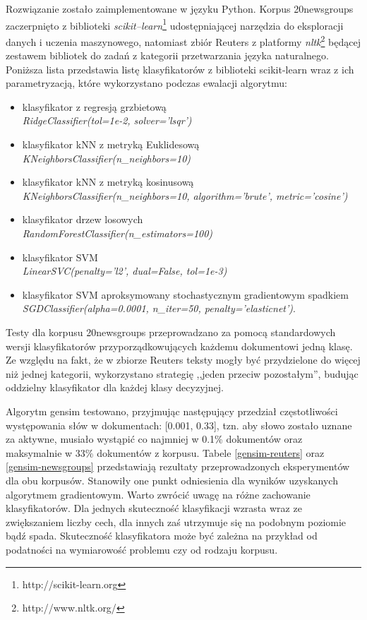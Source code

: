 \documentclass{pracamgr}
\begin{document}
Rozwiązanie zostało zaimplementowane w języku Python. Korpus 20newsgroups zaczerpnięto z biblioteki \textit{scikit--learn}\footnote{http://scikit-learn.org} udostępniającej narzędzia do eksploracji danych i uczenia maszynowego, natomiast zbiór Reuters z platformy \textit{nltk}\footnote{http://www.nltk.org/} będącej zestawem bibliotek do zadań z kategorii przetwarzania języka naturalnego. Poniższa lista przedstawia listę klasyfikatorów z biblioteki scikit-learn wraz z ich parametryzacją, które wykorzystano podczas ewalacji algorytmu:

\begin{itemize}
    \item klasyfikator z regresją grzbietową\\ \textit{RidgeClassifier(tol=1e-2, solver='lsqr')}
    \item klasyfikator kNN z metryką Euklidesową\\ \textit{KNeighborsClassifier(n\_neighbors=10)}
    \item klasyfikator kNN z metryką kosinusową\\
    \textit{KNeighborsClassifier(n\_neighbors=10, algorithm='brute', metric='cosine')}
    \item klasyfikator drzew losowych\\ \textit{RandomForestClassifier(n\_estimators=100)}
    \item klasyfikator SVM\\ \textit{LinearSVC(penalty='l2', dual=False, tol=1e-3)}
    \item klasyfikator SVM aproksymowany stochastycznym gradientowym spadkiem\\ \textit{SGDClassifier(alpha=0.0001, n\_iter=50, penalty='elasticnet')}.
\end{itemize}

Testy dla korpusu 20newsgroups przeprowadzano za pomocą standardowych wersji klasyfikatorów przyporządkowujących każdemu dokumentowi jedną klasę. Ze względu na fakt, że w zbiorze Reuters teksty mogły być przydzielone do więcej niż jednej kategorii, wykorzystano strategię ,,jeden przeciw pozostałym'', budując oddzielny klasyfikator dla każdej klasy decyzyjnej.

Algorytm gensim testowano, przyjmując następujący przedział częstotliwości występowania słów w dokumentach: [0.001, 0.33], tzn. aby słowo zostało uznane za aktywne, musiało wystąpić co najmniej w 0.1\% dokumentów oraz maksymalnie w 33\% dokumentów z korpusu. Tabele \ref{gensim-reuters} oraz \ref{gensim-newsgroups} przedstawiają rezultaty przeprowadzonych eksperymentów dla obu korpusów. Stanowiły one punkt odniesienia dla wyników uzyskanych algorytmem gradientowym. Warto zwrócić uwagę na różne zachowanie klasyfikatorów. Dla jednych skuteczność klasyfikacji wzrasta wraz ze zwiększaniem liczby cech, dla innych zaś utrzymuje się na podobnym poziomie bądź spada. Skuteczność klasyfikatora może być zależna na przykład od podatności na wymiarowość problemu czy od rodzaju korpusu.
\end{document}
